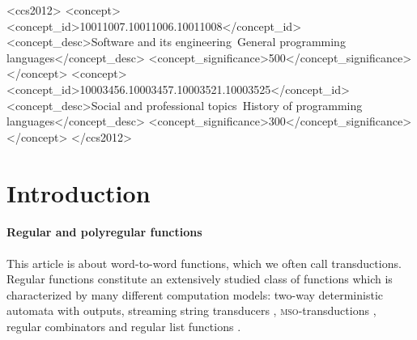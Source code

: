 \documentclass[sigplan,review,anonymous]{acmart}\settopmatter{printfolios=true,printccs=false,printacmref=false}
\newcommand{\mso}{\textsc{mso}\xspace}
\theoremstyle{definition}
\theoremstyle{remark}
\begin{document}
\begin{CCSXML}
<ccs2012>
<concept>
<concept_id>10011007.10011006.10011008</concept_id>
<concept_desc>Software and its engineering~General programming languages</concept_desc>
<concept_significance>500</concept_significance>
</concept>
<concept>
<concept_id>10003456.10003457.10003521.10003525</concept_id>
<concept_desc>Social and professional topics~History of programming languages</concept_desc>
<concept_significance>300</concept_significance>
</concept>
</ccs2012>
\end{CCSXML}





\maketitle




\section*{Introduction}
\paragraph*{Regular and polyregular functions}
This article is about word-to-word functions, which we often call transductions.
Regular functions constitute an extensively studied class of functions which is characterized by many different computation models: two-way deterministic automata with outputs, streaming string transducers \cite{AlurC10}, \mso-transductions \cite{EngelfrietH01}, regular combinators \cite{AlurFR14} and regular list functions \cite{BojanczykDK18}.
\end{document}
